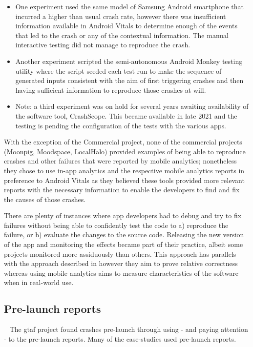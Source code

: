 \begin{itemize}
    \item One experiment used the same model of Samsung Android smartphone that incurred a higher than usual crash rate, however there was insufficient information available in Android Vitals to determine enough of the events that led to the crash or any of the contextual information. The manual interactive testing did not manage to reproduce the crash.
    \item Another experiment scripted the semi-autonomous Android Monkey testing utility where the script seeded each test run to make the sequence of generated inputs consistent with the aim of first triggering crashes and then having sufficient information to reproduce those crashes at will.
    \item Note: a third experiment was on hold for several years awaiting availability of the software tool, CrashScope. This became available in late 2021 and the testing is pending the configuration of the tests with the various apps.
\end{itemize}

With the exception of the Commercial project, none of the commercial projects (Moonpig, Moodspace, LocalHalo) provided examples of being able to reproduce crashes and other failures that were reported by mobile analytics; nonetheless they chose to use in-app analytics and the respective mobile analytics reports in preference to Android Vitals as they believed these tools provided more relevant reports with the necessary information to enable the developers to find and fix the causes of those crashes.

There are plenty of instances where app developers had to debug and try to fix failures without being able to confidently test the code to a) reproduce the failure, or b) evaluate the changes to the source code. Releasing the new version of the app and monitoring the effects became part of their practice, albeit some projects monitored more assiduously than others. This approach has parallels with the approach described in  however they aim to prove relative correctness whereas using mobile analytics aims to measure characteristics of the software when in real-world use.

\subsection{Pre-launch reports}~\label{aiu-pre-launch-reports}
The \Gls{gtaf} project found crashes pre-launch through using - and paying attention - to the pre-launch reports. Many of the case-studies used pre-launch reports. 


